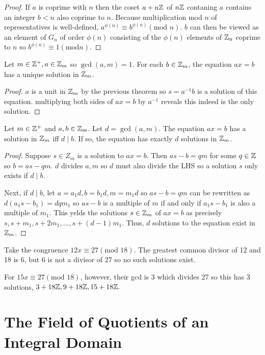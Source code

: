 \begin{proof}
    If $a$ is coprime with $n$ then the coset $a + n\mathbb{Z}$ of $n\mathbb{Z}$ contaning $a$ contains an integer $b <n$ also coprime to $n$. Because multiplication mod $n$ of representatives is well-defined, $a^{\phi(n)} \equiv b^{\phi(n)} (\text{mod } n)$. $b$ can then be viewed as an element of $G_n$ of order $\phi(n)$ consisting of the $\phi(n)$ elements of $\mathbb{Z}_n$ coprime to $n$ so $b^{\phi(n)} \equiv 1 (\text{mod}  n).$
\end{proof}
\begin{theorem}
    Let $m \in \mathbb{Z}^+, a \in \mathbb{Z}_m$ so $\gcd(a,m) = 1$. For each $b \in \mathbb{Z}_m$, the equation $ax = b$ has a unique solution in $\mathbb{Z}_m$.
\end{theorem}
\begin{proof}
    $a$ is a unit in $\mathbb{Z}_m$ by the previous theorem so $s= a^{-1}b$ is a solution of this equation. multiplying both sides of $ax=b$ by $a^{-1}$ reveals this indeed is the only solution.
\end{proof}
\begin{theorem}
    Let $m \in \mathbb{Z}^+$ and $a, b \in \mathbb{Z}_m$. Let $d = \gcd(a,m).$ The equation $ax = b$ has a solution in $\mathbb{Z}_m$ iff $d \mid b$. If so, the equation has exactly $d$ solutions in $\mathbb{Z}_m$.
\end{theorem}
\begin{proof}
    Suppose $s \in Z_m$ is a solution to $ax = b$. Then $as - b = qm$ for some $q \in \mathbb{Z}$ so $b = as - qm$. $d$ divides $a, m$ so $d$ must also divide the LHS so a solution $s$ only exists if $d \mid b$.

    Next, if $d \mid b$, let $a = a_1d, b=b_1d, m=m_1d$ so $as - b = qm$ can be rewritten as $d(a_1s - b_1) = dqm_1$ so $as-b$ is a multiple of $m$ if and only if $a_1s - b_1$ is also a multiple of $m_1$. This yelds the solutions $s \in \mathbb{Z}_m$ of $ax = b$ as precisely $s, s+m_1, s+2m_1, \ldots, s+(d-1)m_1.$ Thus, $d$ solutions to the equation exist in $\mathbb{Z}_m$.
\end{proof}
\begin{example}
    Take the congruence $12x \equiv 27 (\text{mod } 18)$. The greatest common divisor of 12 and 18 is 6, but 6 is not a divisor of 27 so no such solutions exist.

    For $15x \equiv 27 (\text{mod } 18)$, however, their gcd is 3 which divides 27 so this has 3 solutions, $3+ 18\mathbb{Z},9+ 18\mathbb{Z},15+ 18\mathbb{Z}.$
\end{example}

\section{The Field of Quotients of an Integral Domain}

